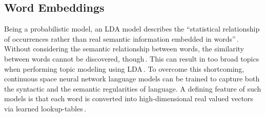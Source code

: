 \subsection{Word Embeddings}
Being a probabilistic model, an LDA model describes the ``statistical relationship of occurrences rather than real semantic information embedded in words''\,\cite{niu_topic2vec_2015}. Without considering the semantic relationship between words, the similarity between words cannot be discovered, though\,\cite{mikolov_efficient_2013}. This can result in too broad topics when performing topic modeling using LDA\,\cite{niu_topic2vec_2015}. To overcome this shortcoming, continuous space neural network language models can be trained to capture both the syntactic and the semantic regularities of language. A defining feature of such models is that each word is converted into high-dimensional real valued vectors via learned lookup-tables\,\cite{mikolov_linguistic_2013}.








